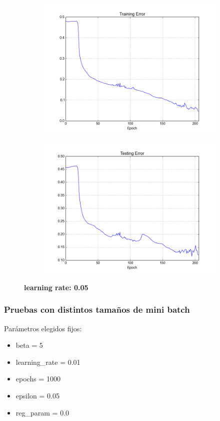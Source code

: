 \begin{figure}[h]	
	\begin{subfigure}[b]{0.5\textwidth}
		\includegraphics[width=\linewidth]{fig/trainingerror_lr0,05_eps0,05_regparam0,00_beta5_batch1.png}
	\end{subfigure}
	\begin{subfigure}[b]{0.5\textwidth}
		\includegraphics[width=\linewidth]{fig/valerror_lr0,05_eps0,05_regparam0,00_beta5_batch1.png}
	\end{subfigure}

	\caption{\textbf{learning rate: 0.05}}
\end{figure}


\subsubsection{Pruebas con distintos tamaños de mini batch}

Parámetros elegidos fijos:

\begin{itemize}
\item beta = 5
\item learning\_rate = 0.01
\item epochs = 1000
\item epsilon = 0.05
\item reg\_param = 0.0
\end{itemize}



\newpage
